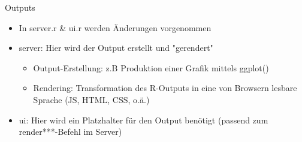 \documentclass[xcolor=dvipsnames]{beamer}\usepackage[]{graphicx}\usepackage[]{color}
\begin{document}
\begin{frame}[fragile]{Outputs}
  \begin{itemize}
    \item In server.r \& ui.r werden Änderungen vorgenommen 
    \item server: Hier wird der Output erstellt und "gerendert"
      \begin{itemize}
        \item Output-Erstellung: z.B Produktion einer Grafik mittels ggplot()
        \item Rendering: Transformation des R-Outputs in eine von Browsern lesbare Sprache (JS, HTML, CSS, o.ä.)
      \end{itemize}
    \item ui: Hier wird ein Platzhalter für den Output benötigt (passend zum render***-Befehl im Server)
  \end{itemize}
  

\end{frame}
\end{document}
